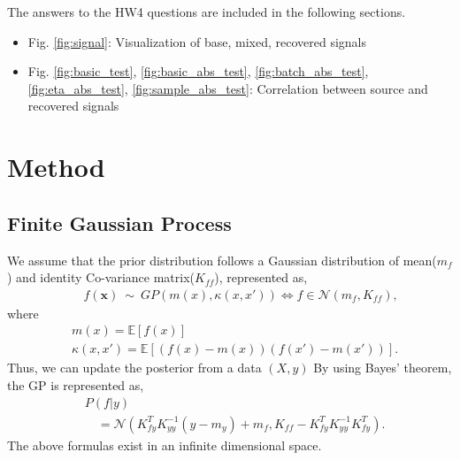 \documentclass[conference]{IEEEtran}
\begin{document}
The answers to the HW4 questions are included in the following sections.
\begin{itemize}
\item Fig. \ref{fig:signal}: Visualization of base, mixed, recovered signals
\item Fig. \ref{fig:basic_test}, \ref{fig:basic_abs_test}, \ref{fig:batch_abs_test}, \ref{fig:eta_abs_test}, \ref{fig:sample_abs_test}: Correlation between source and recovered signals
\end{itemize}



\section{Method}
\label{sec:method}

\subsection{Finite Gaussian Process}
We assume that the prior distribution follows a Gaussian distribution of mean($m_f$) and identity Co-variance matrix($K_{ff}$), represented as,
\begin{equation}
\begin{aligned}
    &\quad f(\boldsymbol{x})\ \sim \ GP(m(x),\kappa(x,x')) \Leftrightarrow f \in \mathcal{N}(m_f,K_{ff}),
\end{aligned}
\end{equation}
where
\begin{equation}
\begin{aligned}
    &m(x) = \mathbb{E}[f(x)]\\
    &\kappa(x,x') = \mathbb{E}[(f(x)-m(x))(f(x')-m(x'))].
\end{aligned}
\end{equation}
Thus, we can update the posterior from a data $(X, y)$
By using Bayes' theorem, the GP is represented as,\\
\begin{equation}
\begin{aligned}
    &P(f|y)\\ 
    &\quad = \mathcal{N}(K_{fy}^TK_{yy}^{-1}(y-m_y) +m_f, K_{ff}-K_{fy}^TK_{yy}^{-1}K_{fy}^T).
\end{aligned}
\end{equation}
The above formulas exist in an infinite dimensional space. 
\end{document}
